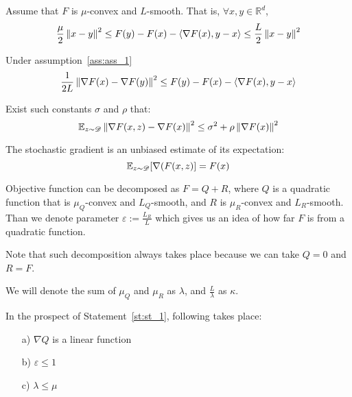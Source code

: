
\begin{assumption} \label{ass:ass_1}
    Assume that $F$ is $\mu$-convex and $L$-smooth. That is, $\forall x, y \in \mathbb{R}^d$,
    \[
    \frac{\mu}{2} \left\|x - y\right\|^2 \leq F(y) - F(x) - \langle \nabla F(x), y-x\rangle \leq \frac{L}{2} \left\|x-y\right\|^2
    \]
\end{assumption}

\begin{corollary} \label{cor:nesterov}
Under assumption~\ref{ass:ass_1}
    \[
    \frac{1}{2L} \left\|\nabla F(x) - \nabla F(y)\right\|^2 \leq F(y) - F(x) - \langle \nabla F(x), y-x\rangle
    \]
\end{corollary}


\begin{assumption} \label{ass:ass_2}
    Exist such constants $\sigma$ and $\rho$ that:
    \[\mathbb{E}_{z \sim \mathcal{D}} \left\|\nabla F(x, z) - \nabla F(x)\right\|^2 \leq \sigma^2
    + \rho \left\|\nabla F(x)\right\|^2 \]
\end{assumption}

\begin{assumption} \label{ass:ass_3}
    The stochastic gradient is an unbiased estimate of its expectation:
    \[ \mathbb{E}_{z \sim \mathcal{D}}[\nabla(F(x, z)] = F(x)\]
\end{assumption}

\begin{statement} \label{st:st_1}
    Objective function can be decomposed as $F = Q + R$, where $Q$ is a quadratic function that is $\mu_Q$-convex and $L_Q$-smooth, and $R$ is $\mu_R$-convex and $L_R$-smooth. Than we denote parameter
    \(\varepsilon := \frac{L_R}{L}\)
    which gives us an idea of how far $F$ is from a quadratic function.
\end{statement}

Note that such decomposition always takes place because we can take $Q = 0$ and $R = F$.

We will denote the sum of $\mu_Q$ and $\mu_R$ as $\lambda$, and $\frac{L}{\lambda}$ as $\kappa$. 

\begin{corollary} \label{cor:linearity}
    In the prospect of Statement~\ref{st:st_1}, following takes place: $\,$
    \begin{enumerate}
    \item[a)] $\nabla Q$ is a linear function
    \item[b)] \(\varepsilon \leq 1\)

    \item[c)] \(\lambda \leq \mu\)
\end{enumerate}
\end{corollary}